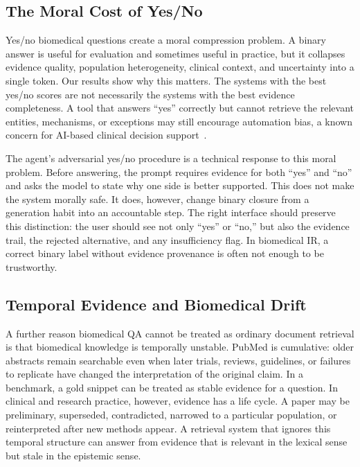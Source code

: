\documentclass[sigconf,nonacm]{acmart}
\begin{document}
\subsection{The Moral Cost of Yes/No}

Yes/no biomedical questions create a moral compression problem. A binary answer is useful for evaluation and sometimes useful in practice, but it collapses evidence quality, population heterogeneity, clinical context, and uncertainty into a single token. Our results show why this matters. The systems with the best yes/no scores are not necessarily the systems with the best evidence completeness. A tool that answers ``yes'' correctly but cannot retrieve the relevant entities, mechanisms, or exceptions may still encourage automation bias, a known concern for AI-based clinical decision support~\cite{khera2023, sutton2020}.

The agent's adversarial yes/no procedure is a technical response to this moral problem. Before answering, the prompt requires evidence for both ``yes'' and ``no'' and asks the model to state why one side is better supported. This does not make the system morally safe. It does, however, change binary closure from a generation habit into an accountable step. The right interface should preserve this distinction: the user should see not only ``yes'' or ``no,'' but also the evidence trail, the rejected alternative, and any insufficiency flag. In biomedical IR, a correct binary label without evidence provenance is often not enough to be trustworthy.

\subsection{Temporal Evidence and Biomedical Drift}

A further reason biomedical QA cannot be treated as ordinary document retrieval is that biomedical knowledge is temporally unstable. PubMed is cumulative: older abstracts remain searchable even when later trials, reviews, guidelines, or failures to replicate have changed the interpretation of the original claim. In a benchmark, a gold snippet can be treated as stable evidence for a question. In clinical and research practice, however, evidence has a life cycle. A paper may be preliminary, superseded, contradicted, narrowed to a particular population, or reinterpreted after new methods appear. A retrieval system that ignores this temporal structure can answer from evidence that is relevant in the lexical sense but stale in the epistemic sense.
\end{document}
